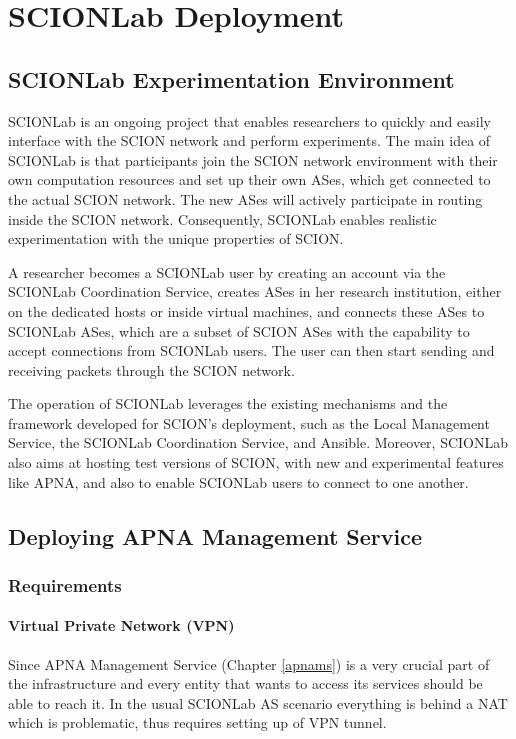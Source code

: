 
\chapter{SCIONLab Deployment} %
\label{scionlab} %

\section{SCIONLab Experimentation Environment}
SCIONLab  is an ongoing project that enables researchers to quickly and easily interface with the SCION network and perform experiments. The main idea of SCIONLab is that participants join the SCION network environment with their own computation resources and set up their own ASes, which get connected to the actual SCION network. The new ASes will actively participate in routing inside the SCION network. Consequently, SCIONLab enables realistic experimentation with the unique properties of SCION.

A researcher becomes a SCIONLab user by creating an account via the SCIONLab Coordination Service, creates ASes in her research institution, either on the dedicated hosts or inside virtual machines, and connects these ASes to SCIONLab ASes, which are a subset of SCION ASes with the capability to accept connections from SCIONLab users. The user can then start sending and receiving packets through the SCION network.

The operation of SCIONLab leverages the existing mechanisms and the framework developed for SCION's deployment, such as the Local Management Service, the SCIONLab Coordination Service, and Ansible. Moreover, SCIONLab also aims at hosting test versions of SCION, with new and experimental features like APNA, and also to enable SCIONLab users to connect to one another.

\section{Deploying APNA Management Service}
\subsection{Requirements}
\subsubsection{Virtual Private Network (VPN)}
Since APNA Management Service (Chapter \ref{apnams}) is a very crucial part of the infrastructure and every entity that wants to access its services should be able to reach it. In the usual SCIONLab AS scenario everything is behind a NAT which is problematic, thus requires setting up of VPN tunnel. 

